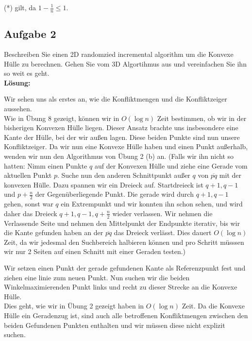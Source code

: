 \documentclass[11pt,a4paper,ngerman]{article}
\begin{document}
(*) gilt, da $1- \frac{1}{n} \leq 1$.

\subsection*{Aufgabe 2}

Beschreiben Sie einen 2D randomzied incremental algorithm um die Konvexe Hülle zu berechnen. Gehen Sie vom 3D Algortihmus aus und vereinfachen Sie ihn so weit es geht.\\

\textbf{Lösung:}

Wir sehen uns als erstes an, wie die Konfliktmengen und die Konfliktzeiger aussehen.\\

Wie in Übung 8 gezeigt, können wir in $O(\log n)$ Zeit bestimmen, ob wir in
der bisherigen Konvexen Hülle liegen. Dieser
Ansatz brachte uns insbesondere eine Kante der Hülle, bei
der wir außen lagen. Diese beiden Punkte sind
nun unsere Konfliktzeiger. Da wir nun eine Konvexe Hülle haben und
einen Punkt außerhalb, wenden wir nun den Algorithmus von Übung 2 (b) an.
(Falls wir ihn nicht so hatten: Nimm einen Punkte $q$ auf der Konvexen Hülle
und ziehe eine Gerade vom aktuellen Punkt $p$. Suche nun den anderen
Schnittpunkt außer $q$ von $\overline{pq}$ mit der konvexen Hülle.
Dazu spannen wir ein Dreieck auf. Startdreieck ist $q+1,q-1$ und $p+\frac{n}{2}$ der Gegenüberliegende Punkt. Die gerade wird durch $q+1,q-1$ gehen, sonst
war $q$ ein Extrempunkt und wir konnten ihn schon sehen, und wird
daher das Dreieck $q+1,q-1,q+\frac{n}{2}$ wieder verlassen. Wir nehmen die Verlassende Seite und nehmen den Mittelpunkt der Endpunkte iterativ, bis wir
die Kante gefunden haben an der $\overline{pq}$ das Dreieck verlässt. Dies
dauert $O(\log n)$ Zeit, da wir jedesmal den Suchbereich halbieren können und
pro Schritt müsssen wir nur 2 Seiten auf einen Schnitt mit einer Geraden testen.)


Wir setzen einen Punkt der gerade gefundenen Kante als Referenzpunkt fest
und ziehen eine linie zum neuen Punkt. Nun suchen wir die beiden Winkelmaximierenden Punkt links und recht zu dieser Strecke an die Konvexe Hülle.\\

Dies geht, wie wir in Übung 2 gezeigt haben in $O(\log n)$ Zeit. Da die
Konvexe Hülle ein Geradenzug ist, sind auch alle betroffenen Konfliktmengen
zwischen den beiden Gefundenen Punkten enthalten und wir müssen diese nicht
explizit suchen.\\
\end{document}
